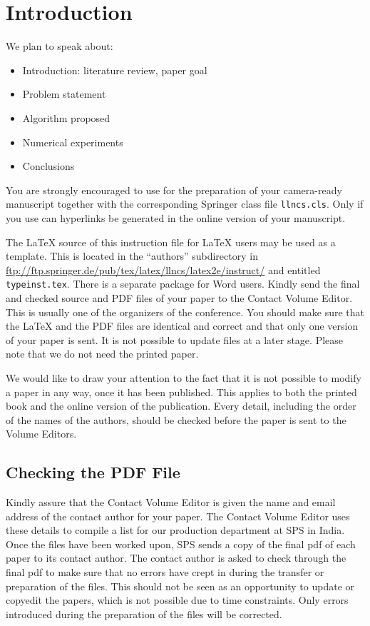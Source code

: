 \documentclass[runningheads,a4paper]{llncs}
\begin{document}
\section{Introduction}
We plan to speak about:
\begin{itemize}
\item Introduction: literature review, paper goal
\item Problem statement
\item Algorithm proposed
\item Numerical experiments
\item Conclusions
\end{itemize}


You are strongly encouraged to use \LaTeXe{} for the
preparation of your camera-ready manuscript together with the
corresponding Springer class file \verb+llncs.cls+. Only if you use
\LaTeXe{} can hyperlinks be generated in the online version
of your manuscript.

The \LaTeX{} source of this instruction file for \LaTeX{} users may be
used as a template. This is
located in the ``authors'' subdirectory in
\url{ftp://ftp.springer.de/pub/tex/latex/llncs/latex2e/instruct/} and
entitled \texttt{typeinst.tex}. There is a separate package for Word 
users. Kindly send the final and checked source
and PDF files of your paper to the Contact Volume Editor. This is
usually one of the organizers of the conference. You should make sure
that the \LaTeX{} and the PDF files are identical and correct and that
only one version of your paper is sent. It is not possible to update
files at a later stage. Please note that we do not need the printed
paper.

We would like to draw your attention to the fact that it is not possible
to modify a paper in any way, once it has been published. This applies
to both the printed book and the online version of the publication.
Every detail, including the order of the names of the authors, should
be checked before the paper is sent to the Volume Editors.

\subsection{Checking the PDF File}

Kindly assure that the Contact Volume Editor is given the name and email
address of the contact author for your paper. The Contact Volume Editor
uses these details to compile a list for our production department at
SPS in India. Once the files have been worked upon, SPS sends a copy of
the final pdf of each paper to its contact author. The contact author is
asked to check through the final pdf to make sure that no errors have
crept in during the transfer or preparation of the files. This should
not be seen as an opportunity to update or copyedit the papers, which is
not possible due to time constraints. Only errors introduced during the
preparation of the files will be corrected.
\end{document}
